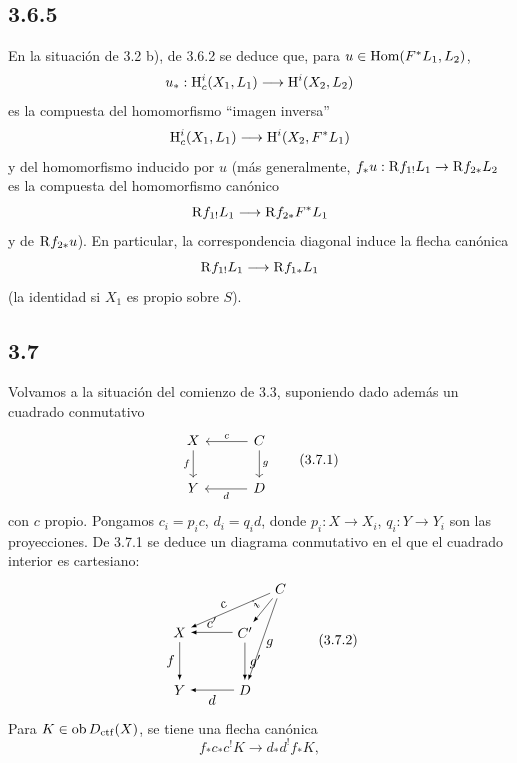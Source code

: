 \subsection*{3.6.5}
En la situación de 3.2 b), de 3.6.2 se deduce que, para $u\in\operatorname{Hom}(F^*L_1,L_2)$,
\[
u_*:\mathrm{H}_c^i(X_1,L_1)\longrightarrow \mathrm{H}^i(X_2,L_2)
\]
es la compuesta del homomorfismo ``imagen inversa''
\[
\mathrm{H}_c^i(X_1,L_1)\longrightarrow \mathrm{H}^i(X_2,F^*L_1)
\]
y del homomorfismo inducido por $u$ (más generalmente, $f_*u:\mathrm{R} f_{1!}L_1\to \mathrm{R} f_{2*}L_2$ es la compuesta del homomorfismo canónico
\[
\mathrm{R} f_{1!}L_1\longrightarrow \mathrm{R} f_{2*}F^*L_1
\]
y de $\mathrm{R} f_{2*}u$). En particular, la correspondencia diagonal induce la flecha canónica
\[
\mathrm{R} f_{1!}L_1\longrightarrow \mathrm{R} f_{1*}L_1
\]
(la identidad si $X_1$ es propio sobre $S$).

\subsection*{3.7}
Volvamos a la situación del comienzo de 3.3, suponiendo dado además un cuadrado conmutativo
\begin{equation}
\begin{tikzcd}[column sep=3em,row sep=2em]
X \arrow[d,"f"'] & C \arrow[l,"c"'] \arrow[d,"g"] \\
Y & D \arrow[l,"d"]
\end{tikzcd}
\tag{3.7.1}
\end{equation}
con $c$ propio. Pongamos $c_i=p_ic$, $d_i=q_id$, donde $p_i:X\to X_i$, $q_i:Y\to Y_i$ son las proyecciones. De 3.7.1 se deduce un diagrama conmutativo en el que el cuadrado interior es cartesiano:
\begin{equation}
\begin{tikzpicture}[>=latex,baseline=(current bounding box.center),scale=1]
\node (X) at (0,0) {$X$};
\node (Y) at (0,-1.45) {$Y$};
\node (Cp) at (1.65,0) {$C'$};
\node (D) at (1.65,-1.45) {$D$};
\node (C) at (2.55,1.1) {$C$};
\draw[->] (C) -- node[above,sloped,pos=.55] {$c$} (X);
\draw[->] (C) -- node[above,sloped,pos=.50] {$i$} (Cp);
\draw[->] (C) -- node[right,pos=.55] {$g$} (D);
\draw[->] (Cp) -- node[above] {$c'$} (X);
\draw[->] (Cp) -- node[right] {$g'$} (D);
\draw[->] (X) -- node[left] {$f$} (Y);
\draw[->] (D) -- node[below] {$d$} (Y);
\end{tikzpicture}
\tag{3.7.2}
\end{equation}
Para $K\in\operatorname{ob}D_{\mathrm{ctf}}(X)$, se tiene una flecha canónica
\begin{equation}
f_*c_*c^!K\longrightarrow d_*d^!f_*K,
\tag{3.7.3}
\end{equation}
